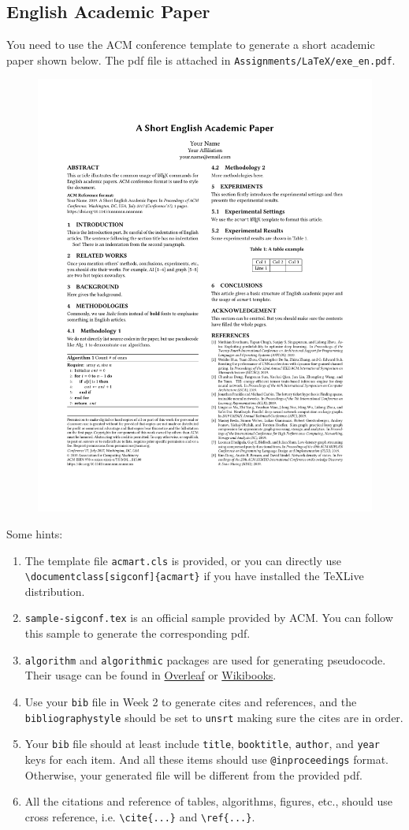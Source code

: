 \documentclass[english]{../TexTemplate/thesis}
\begin{document}
\subsection{English Academic Paper}
You need to use the ACM conference template to generate a short academic paper shown below.
The pdf file is attached in \verb'Assignments/LaTeX/exe_en.pdf'.
\begin{figure}[!t]
\centering
\includegraphics[width=0.7\linewidth]{../Assignments/LaTeX/exe_en.pdf}
\end{figure}

Some hints:
\begin{enumerate}
	\item The template file \verb'acmart.cls' is provided, or you can directly use \verb'\documentclass[sigconf]{acmart}' if you have installed the TeXLive distribution.
	\item \verb'sample-sigconf.tex' is an official sample provided by ACM.
	You can follow this sample to generate the corresponding pdf.
	\item \verb'algorithm' and \verb'algorithmic' packages are used for generating pseudocode. Their usage can be found in \href{https://www.overleaf.com/learn/latex/algorithms}{Overleaf} or \href{https://en.wikibooks.org/wiki/LaTeX/Algorithms}{Wikibooks}.
	\item Use your \verb'bib' file in Week 2 to generate cites and references, and the \verb'bibliographystyle' should be set to \verb'unsrt' making sure the cites are in order.
	\item Your \verb'bib' file should at least include \verb'title', \verb'booktitle', \verb'author', and \verb'year' keys for each item.
	And all these items should use \verb'@inproceedings' format. Otherwise, your generated file will be different from the provided pdf.
	\item All the citations and reference of tables, algorithms, figures, etc., should use cross reference, i.e. \verb'\cite{...}' and \verb'\ref{...}'.
\end{enumerate}
\end{document}
